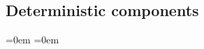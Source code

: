 \documentclass[11pt]{book}
\begin{document}
\subsection{Deterministic components}

\def\beq{ \begin{fleqn} \begin{equation}}
\def\eeq{\end{equation} \end{fleqn} }
\def\bec{\\[-30pt]\begin{center}}%
\def\eec{\end{center} \\[-12pt]}%

\leftskip=0em%
\parindent=0em%
\end{document}
